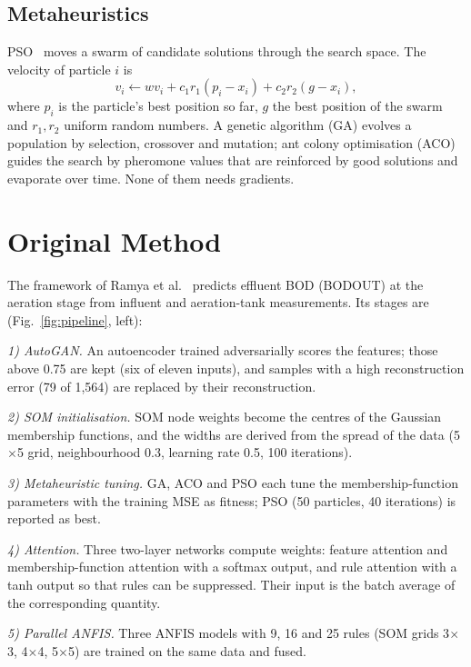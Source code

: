 \documentclass[conference]{IEEEtran}
\begin{document}
\subsection{Metaheuristics}
PSO~\cite{kennedy1995} moves a swarm of candidate solutions through the search space. The velocity of particle $i$ is
\begin{equation}
v_i \leftarrow w v_i + c_1 r_1 (p_i - x_i) + c_2 r_2 (g - x_i),
\end{equation}
where $p_i$ is the particle's best position so far, $g$ the best position of the swarm and $r_1,r_2$ uniform random numbers. A genetic algorithm (GA) evolves a population by selection, crossover and mutation; ant colony optimisation (ACO) guides the search by pheromone values that are reinforced by good solutions and evaporate over time. None of them needs gradients.

\section{Original Method}
\label{sec:original}
The framework of Ramya et al.~\cite{ramya2025} predicts effluent BOD (BODOUT) at the aeration stage from influent and aeration-tank measurements. Its stages are (Fig.~\ref{fig:pipeline}, left):

\emph{1) AutoGAN.} An autoencoder trained adversarially scores the features; those above 0.75 are kept (six of eleven inputs), and samples with a high reconstruction error (79 of 1,564) are replaced by their reconstruction.

\emph{2) SOM initialisation.} SOM node weights become the centres of the Gaussian membership functions, and the widths are derived from the spread of the data (5$\times$5 grid, neighbourhood 0.3, learning rate 0.5, 100 iterations).

\emph{3) Metaheuristic tuning.} GA, ACO and PSO each tune the membership-function parameters with the training MSE as fitness; PSO (50 particles, 40 iterations) is reported as best.

\emph{4) Attention.} Three two-layer networks compute weights: feature attention and membership-function attention with a softmax output, and rule attention with a tanh output so that rules can be suppressed. Their input is the batch average of the corresponding quantity.

\emph{5) Parallel ANFIS.} Three ANFIS models with 9, 16 and 25 rules (SOM grids 3$\times$3, 4$\times$4, 5$\times$5) are trained on the same data and fused.
\end{document}
